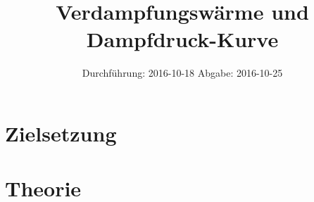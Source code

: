 

\subject{V203}
\title{Verdampfungswärme und Dampfdruck-Kurve}
\date{
	Durchführung: 2016-10-18
	\hspace{3em}
	Abgabe: 2016-10-25
}



\maketitle
\thispagestyle{empty}
\tableofcontents
\newpage

\section{Zielsetzung}

\section{Theorie}

